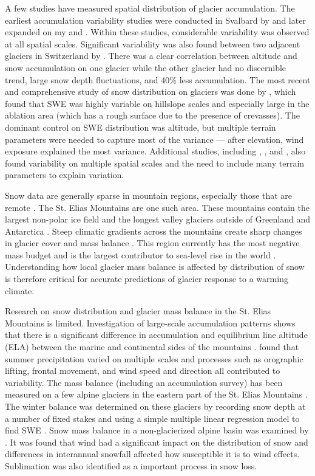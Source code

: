 \documentclass[12pt]{article}
\begin{document}
A few studies have measured spatial distribution of glacier accumulation. The earliest accumulation variability studies were conducted in Svalbard by \cite{Winther1998} and later expanded on my \cite{Palli2002} and \cite{Grabiec2011}. Within these studies, considerable variability was observed at all spatial scales. Significant variability was also found between two adjacent glaciers in Switzerland by \cite{Machguth2006}. There was a clear correlation between altitude and snow accumulation on one glacier while the other glacier had no discernible trend, large snow depth fluctuations, and 40$\%$ less accumulation. The most recent and comprehensive study of snow distribution on glaciers was done by \cite{McGrath2015}, which found that SWE was highly variable on hillslope scales and especially large in the ablation area (which has a rough surface due to the presence of crevasses). The dominant control on SWE distribution was altitude, but multiple terrain parameters were needed to capture most of the variance --- after elevation, wind exposure explained the most variance. Additional studies, including \cite{Sold2013}, \cite{Pelt2014}, and \cite{Dadic2010}, also found variability on multiple spatial scales and the need to include many terrain parameters to explain variation. 

Snow data are generally sparse in mountain regions, especially those that are remote \citep{Marcus1970}. The St. Elias Mountains are one such area. These mountains contain the largest non-polar ice field and the longest valley glaciers outside of Greenland and Antarctica \citep{Marcus1970, Danby2003}. Steep climatic gradients across the mountains create sharp changes in glacier cover and mass balance \citep{Clarke2002}. This region currently has the most negative mass budget and is the largest contributor to sea-level rise in the world \citep{Kaser2006, Gardner2013}. Understanding how local glacier mass balance is affected by distribution of snow is therefore critical for accurate predictions of glacier response to a warming climate. 

Research on snow distribution and glacier mass balance in the St. Elias Mountains is limited. Investigation of large-scale accumulation patterns shows that there is a significant difference in accumulation and equilibrium line altitude (ELA) between the marine and continental sides of the mountains \citep{Marcus1970}. \cite{Taylor1969} found that summer precipitation varied on multiple scales and processes such as orographic lifting, frontal movement, and wind speed and direction all contributed to variability. The mass balance (including an accumulation survey) has been measured on a few alpine glaciers in the eastern part of the St. Elias Mountains \citep[e.g.][]{Wheler2014}. The winter balance was determined on these glaciers by recording snow depth at a number of fixed stakes and using a simple multiple linear regression model to find SWE  \citep{Wheler2014}. Snow mass balance in a non-glacierized alpine basin was examined by \cite{Pomeroy1999}. It was found that wind had a significant impact on the distribution of snow and differences in interannual snowfall affected how susceptible it is to wind effects. Sublimation was also identified as a important process in snow loss. 
\end{document}
